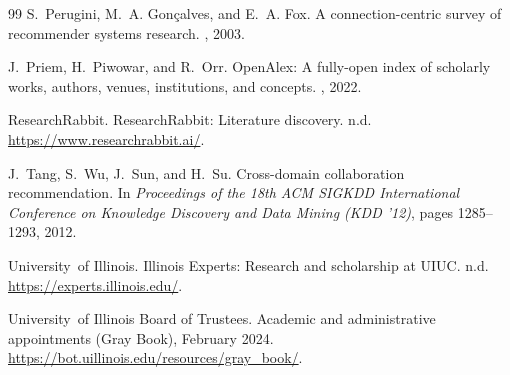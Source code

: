 \documentclass[10pt,twocolumn,letterpaper]{article}
\begin{document}
\begin{thebibliography}{99}
S.~Perugini, M.~A. Gon{\c{c}}alves, and E.~A. Fox.
\newblock A connection-centric survey of recommender systems research.
, 2003.

J.~Priem, H.~Piwowar, and R.~Orr.
\newblock OpenAlex: A fully-open index of scholarly works, authors, venues, institutions, and concepts.
, 2022.

ResearchRabbit.
\newblock ResearchRabbit: Literature discovery. n.d.
\newblock \url{https://www.researchrabbit.ai/}.

J.~Tang, S.~Wu, J.~Sun, and H.~Su.
\newblock Cross-domain collaboration recommendation.
\newblock In {\em Proceedings of the 18th ACM SIGKDD International Conference on Knowledge Discovery and Data Mining (KDD '12)}, pages 1285--1293, 2012.

University~of Illinois.
\newblock Illinois Experts: Research and scholarship at {UIUC}. n.d.
\newblock \url{https://experts.illinois.edu/}.

University~of Illinois Board of Trustees.
\newblock Academic and administrative appointments (Gray Book), February 2024.
\newblock \url{https://bot.uillinois.edu/resources/gray_book/}.

\end{thebibliography}
\end{document}
